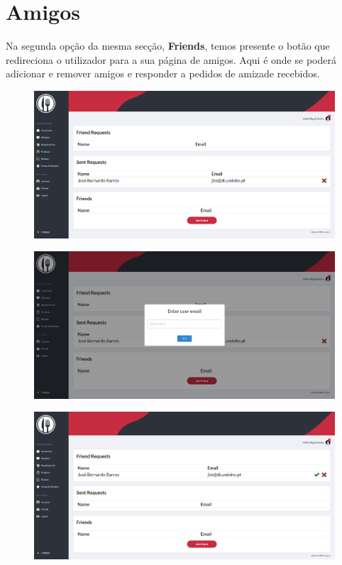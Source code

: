 \documentclass[a4paper]{report}
\begin{document}
    \section{Amigos}

    Na segunda opção da mesma secção, \textbf{Friends}, temos presente o botão
    que redireciona o utilizador para a sua página de amigos. Aqui é onde 
    se poderá adicionar e remover amigos e responder a pedidos de amizade
    recebidos. 

    \begin{figure}[H]
        \centering
            \includegraphics[width=\textwidth]{images/produto_final/pedido_amigos_enviado.png}
    \end{figure}

    \begin{figure}[H]
        \centering
            \includegraphics[width=\textwidth]{images/produto_final/adicionar_amigo.png}
    \end{figure}

    \begin{figure}[H]
        \centering
            \includegraphics[width=\textwidth]{images/produto_final/pedido_recebido.png}
    \end{figure}
\end{document}
